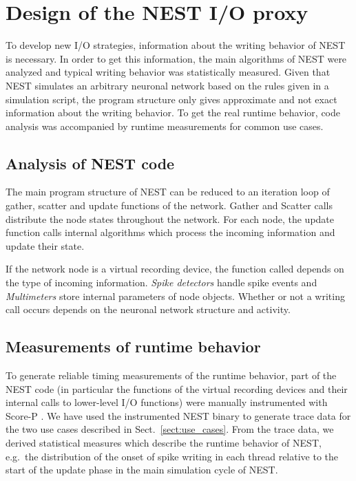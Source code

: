 \documentclass[]{YIC2015}
\begin{document}
\section{Design of the NEST I/O proxy}

To develop new I/O strategies, information about the writing behavior
of NEST is necessary. In order to get this information, the main
algorithms of NEST were analyzed and typical writing behavior was
statistically measured.
%
Given that NEST simulates an arbitrary neuronal network based on the
rules given in a simulation script, the program structure only gives
approximate and not exact information about the writing behavior. To
get the real runtime behavior, code analysis was accompanied by runtime
measurements for common use cases.

\subsection{Analysis of NEST code}

The main program structure of NEST can be reduced to an iteration loop
of gather, scatter and update functions of the network. Gather and
Scatter calls distribute the node states throughout the network. For
each node, the update function calls internal algorithms which process
the incoming information and update their state.

If the network node is a virtual recording device, the function called
depends on the type of incoming information. \emph{Spike detectors}
handle spike events and \emph{Multimeters} store internal parameters
of node objects. Whether or not a writing call occurs depends on the
neuronal network structure and activity.

\subsection{Measurements of runtime behavior}

To generate reliable timing measurements of the runtime behavior, part
of the NEST code (in particular the functions of the virtual recording
devices and their internal calls to lower-level I/O functions) were
manually instrumented with Score-P \cite{ScoreP}.
%
We have used the instrumented NEST binary to generate trace data for the
two use cases described in Sect.~\ref{sect:use_cases}.
From the trace data, we derived
statistical measures which describe the runtime behavior of NEST,
e.g.~the distribution of the onset of spike writing in each thread
relative to the start of the update phase in the main simulation cycle
of NEST.
\end{document}

